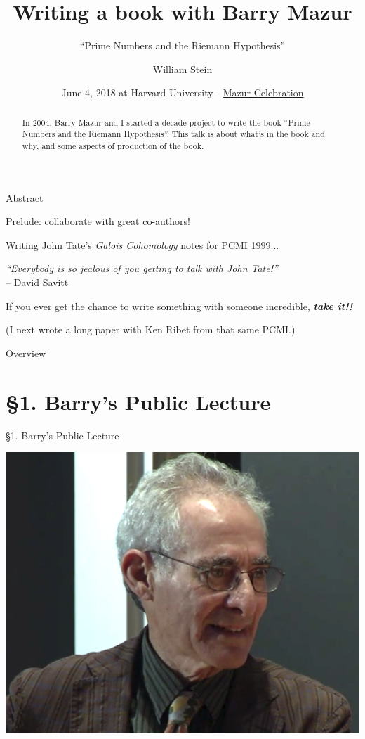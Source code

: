 \documentclass{beamer}
\title{Writing a book with Barry Mazur}
\subtitle{``Prime Numbers and the Riemann Hypothesis''}
\author[W.\thinspace{}Stein]{William Stein}
\date[Mazur 80]{June 4, 2018 at Harvard University - \href{http://www.math.harvard.edu/conferences/mazur18/}{Mazur Celebration}}
\institute[SageMath, Inc. \& UW]{SageMath, Inc. and University of Washington}
\newcommand{\mysection}[2]{\section{\S#1. #2}%
\begin{frame}{}
\vfill
\begin{center}
\hrulefill
\vfill
\Huge\sc \S#1. #2
\vfill
\hrulefill
\end{center}
\vfill
\end{frame}}
\begin{document}
\begin{frame}
  \titlepage
\end{frame}

\begin{frame}{Abstract}
  \begin{abstract}
    In 2004, Barry Mazur and I started a decade project to write the
    book ``Prime Numbers and the Riemann Hypothesis''.
    This talk is about
    what's in the book and why, and some aspects
    of production of the book.
  \end{abstract}
\end{frame}

\begin{frame}{Prelude: collaborate with great co-authors!}

  Writing John Tate's {\em Galois Cohomology} notes for PCMI 1999...

  \vfill

  \begin{block}{}
    {\em
      ``Everybody is so jealous of you getting
      to talk with John Tate!''}\\
    -- David Savitt
  \end{block}

  \vfill

  If you ever get the chance
  to write something with someone incredible,
  {\bf\em take it!!}

  \vfill

  (I next wrote a long paper with Ken Ribet from that same PCMI.)

\end{frame}


\begin{frame}{Overview}
  \tableofcontents
\end{frame}

\mysection{1}{Barry's Public Lecture}

\begin{frame}
\begin{center}
\includegraphics[height=.7\textheight]{pics/barry-msri}
\end{center}

\end{frame}
\end{document}
